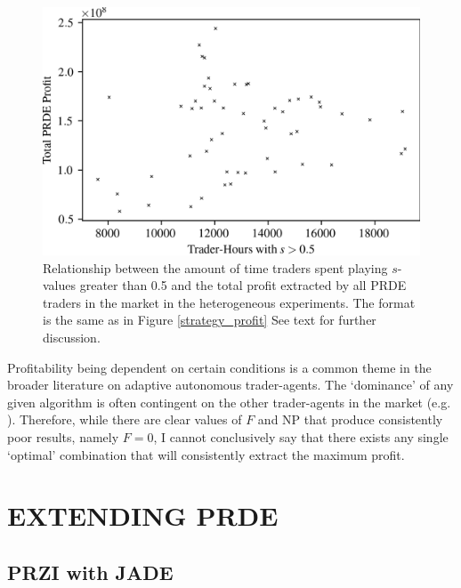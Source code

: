 \documentclass[a4paper,twoside]{article}
\begin{document}
\begin{figure}[htbp]
    \centerline{\includegraphics[width=\columnwidth]{ZIP_strategy_profit.png}}
    \caption{
        Relationship between the amount of time traders spent playing $s$-values greater than 0.5 and the total profit extracted by all PRDE traders in the market in the heterogeneous experiments.
        The format is the same as in Figure \ref{strategy_profit}
        See text for further discussion.
    }
    \label{ZIP_strategy_profit}
\end{figure}

Profitability being dependent on certain conditions is a common theme in the broader literature on adaptive autonomous trader-agents.
The `dominance' of any given algorithm is often contingent on the other trader-agents in the market (e.g. \cite{Vach}).
Therefore, while there are clear values of $F$ and $\mathrm{NP}$ that produce consistently poor results, namely $F=0$, I cannot conclusively say that there exists any single `optimal' combination that will consistently extract the maximum profit.

\section{\uppercase{Extending PRDE}}

\subsection{PRZI with JADE}
\end{document}
